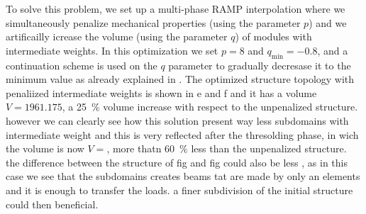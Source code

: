 \begin{figure}
    \hfill
    \hfill
    \hfill
    \caption{}
    \label{fig:06_fixed_module}
\end{figure}

To solve this problem, we set up a multi-phase RAMP interpolation where we simultaneously penalize mechanical properties (using the parameter $p$) and we artificailly icrease the volume (using the parameter $q$) of modules with intermediate weights. In this optimization we set $p=8$ and $q_\text{min}=-0.8$, and a continuation scheme is used on the $q$ parameter to gradually decresase it to the minimum value as already explained in . The optimized structure topology with penaliized intermediate weights is shown in e and f and it has a volume $V = 1961.175$, a \qty{25}{\percent} volume increase with respect to the unpenalized structure. however we can clearly see how this solution present way less subdomains with intermediate weight and this is very reflected after the thresolding phase, in wich the volume is now $V=$, more thatn \qty{60}{\percent} less than the unpenalized structure. the difference between the structure of fig and fig could also be less , as in this case we see that the subdomains creates beams tat are made by only an elements and it is enough to transfer the loads. a finer subdivision of the initial structure could then beneficial.

